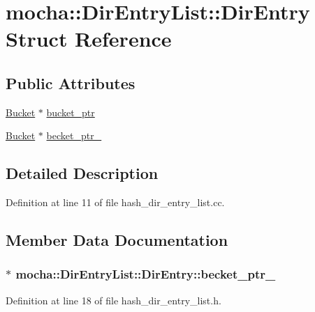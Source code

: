 \hypertarget{structmocha_1_1_dir_entry_list_1_1_dir_entry}{
\section{mocha::DirEntryList::DirEntry Struct Reference}
\label{structmocha_1_1_dir_entry_list_1_1_dir_entry}
}
\subsection*{Public Attributes}
\begin{DoxyCompactItemize}
\item 
\hyperlink{classmocha_1_1_bucket}{Bucket} $\ast$ \hyperlink{structmocha_1_1_dir_entry_list_1_1_dir_entry_a1f99f0664a09b1f9077a2350e71972e6}{bucket\_\-ptr}
\item 
\hyperlink{classmocha_1_1_bucket}{Bucket} $\ast$ \hyperlink{structmocha_1_1_dir_entry_list_1_1_dir_entry_a6851e0d1638f36194bfb9d6d26d7c311}{becket\_\-ptr\_\-}
\end{DoxyCompactItemize}


\subsection{Detailed Description}


Definition at line 11 of file hash\_\-dir\_\-entry\_\-list.cc.



\subsection{Member Data Documentation}
\hypertarget{structmocha_1_1_dir_entry_list_1_1_dir_entry_a6851e0d1638f36194bfb9d6d26d7c311}{
\subsubsection[{becket\_\-ptr\_\-}]{$\ast$ {\bf mocha::DirEntryList::DirEntry::becket\_\-ptr\_\-}}}
\label{structmocha_1_1_dir_entry_list_1_1_dir_entry_a6851e0d1638f36194bfb9d6d26d7c311}


Definition at line 18 of file hash\_\-dir\_\-entry\_\-list.h.

